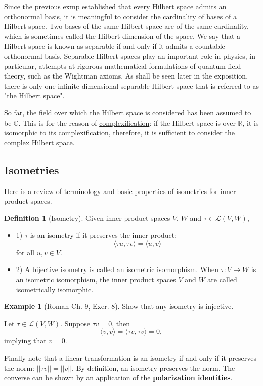 \documentclass[psamsfonts]{amsart}
\theoremstyle{definition}
\newtheorem{exmp}[thm]{Example}
\newtheorem{defn}[thm]{Definition}
\theoremstyle{remark}
\numberwithin{equation}{section}
\begin{document}
Since the previous exmp established that every Hilbert space admits an orthonormal basis, it is meaningful to consider the cardinality of bases of a Hilbert space. Two bases of the same Hilbert space are of the same cardinality, which is sometimes called the Hilbert dimension of the space. We say that a Hilbert space is known as separable if and only if it admits a countable orthonormal basis. Separable Hilbert spaces play an important role in physics, in particular, attempts at rigorous mathematical formulations of quantum field theory, such as the Wightman axioms. As shall be seen later in the exposition, there is only one infinite-dimensional separable Hilbert space that is referred to as "the Hilbert space". 

So far, the field over which the Hilbert space is considered has been assumed to be $\mathbb{C}$. This is for the reason of \href{https://www.wikiwand.com/en/Complexification}{complexification}: if the Hilbert space is over $\mathbb{R}$, it is isomorphic to its complexification, therefore, it is sufficient to consider the complex Hilbert space.  

\subsection{Isometries}
Here is a review of terminology and basic properties of isometries for inner product spaces. 
\begin{defn}[Isometry]
Given inner product spaces $V$, $W$ and $\tau \in \mathcal{L} (V, W),$ 
\begin{itemize}
    \item 1) $\tau$ is an isometry if it preserves the inner product: 
    $$\langle \tau u, \tau v \rangle = \langle u, v \rangle $$
    for all $u, v \in V$.
    \item 2) A bijective isometry is called an isometric isomorphism. When $\tau: V \rightarrow W$ is an isometric isomorphism, the inner product spaces $V$ and $W$ are called isometrically isomorphic. 
\end{itemize}
\end{defn}

\begin{exmp}[Roman Ch. 9, Exer. 8]
Show that any isometry is injective. 

Let $\tau \in \mathcal{L} (V, W)$. Suppose $\tau v = 0$, then 
$$\langle v, v \rangle = \langle \tau v, \tau v \rangle = 0,$$
implying that $v = 0$. 
\end{exmp}
Finally note that a linear transformation is an isometry if and only if it preserves the norm: $||\tau v|| = ||v||$. By definition, an isometry preserves the norm. The converse can be shown by an application of the  \textbf{\href{https://www.wikiwand.com/en/Polarization_identity}{polarization identities}}.
\end{document}
